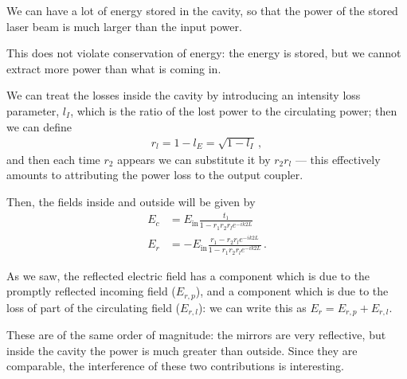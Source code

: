 \documentclass[main.tex]{subfiles}
\begin{document}


We can have a lot of energy stored in the cavity, so that the power of the stored laser beam is much larger than the input power.

This does not violate conservation of energy: the energy is stored, but we cannot extract more power than what is coming in. 


We can treat the losses inside the cavity by introducing an intensity loss parameter, \(l_{I}\), which is the ratio of the lost power to the circulating power; then we can define
%
\begin{align}
r_{l} = 1 - l_{E} = \sqrt{1 - l_{I}}
\,,
\end{align}
% 
and then each time \(r_2 \) appears we can substitute it by \(r_2 r_l\) --- this effectively amounts to attributing the power loss to the output coupler. 

Then, the fields inside and outside will be given by 
%
\begin{subequations}
\begin{align}
E_{c} &= E _{\text{in}} \frac{t_1 }{1 - r_1 r_2 r_{l} e^{-ik2L}}  \\
E_{r} &= - E _{\text{in}} \frac{r_1 - r_2 r_{l} e^{-ik2L}}{1 - r_1 r_2 r_{l} e^{-ik 2L}}
\,.
\end{align}
\end{subequations}

As we saw, the reflected electric field has a component which is due to the promptly reflected incoming field (\(E_{r, p}\)), and a component which is due to the loss of part of the circulating field (\(E_{r, l}\)): we can write this as \(E_r = E_{r, p} + E_{r, l}\). 

These are of the same order of magnitude: the mirrors are very reflective, but inside the cavity the power is much greater than outside. Since they are comparable, the interference of these two contributions is interesting. 
\end{document}
